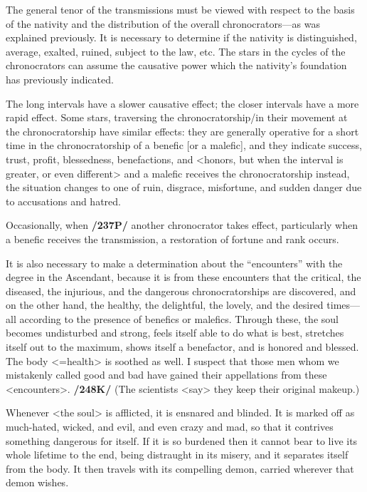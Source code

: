The general tenor of the transmissions must be viewed with respect to the basis of the nativity and the distribution of the overall chronocrators—as was explained previously. It is necessary to determine if the nativity is distinguished, average, exalted, ruined, subject to the law, etc. The stars in the cycles of the chronocrators can assume the
causative power which the nativity’s foundation has previously indicated.

The long intervals have a slower causative effect; the closer intervals have a more rapid effect. Some stars, traversing the chronocratorship/in their movement at the chronocratorship have similar effects: they
are generally operative for a short time in the chronocratorship of a benefic [or a malefic], and they indicate success, trust, profit, blessedness, benefactions, and <honors, but when the interval is greater, or even different> and a malefic receives the chronocratorship instead, the situation changes to one of ruin, disgrace,
misfortune, and sudden danger due to accusations and hatred. 

Occasionally, when \textbf{/237P/} another chronocrator takes effect, particularly when a benefic receives the transmission, a restoration of fortune and rank occurs. 

It is also necessary to make a determination about the “encounters” with the degree in the Ascendant, because it is from these encounters that the critical, the diseased, the injurious, and the dangerous chronocratorships are discovered, and on the other hand, the healthy, the delightful, the lovely, and the desired times—all according to the presence of benefics or malefics. Through these, the soul becomes undisturbed and strong, feels itself able to do what is best, stretches itself out to the maximum, shows itself a benefactor, and is honored and blessed. The body <=health> is soothed as well. I suspect that those men whom we mistakenly called good and bad have gained their appellations from these <encounters>. \textbf{/248K/} (The scientists <say> they keep their original makeup.) 

Whenever <the soul> is afflicted, it is ensnared and blinded. It is marked off as much-hated, wicked, and evil, and even crazy and mad, so that it contrives something dangerous for itself. If it is so burdened then it cannot bear to live its whole lifetime to the end, being distraught in its misery, and it separates itself from the body. It then travels with its compelling demon, carried wherever that demon wishes.
\newpage